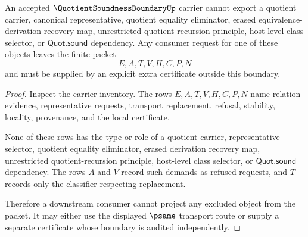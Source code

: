 \begin{theorem}
\label{thm:quotient-soundness-boundary-non-escape}
An accepted $\QuotientSoundnessBoundaryUp$ carrier cannot export a quotient carrier, canonical representative, quotient equality eliminator, erased equivalence-derivation recovery map, unrestricted quotient-recursion principle, host-level class selector, or $\mathsf{Quot.sound}$ dependency. Any consumer request for one of these objects leaves the finite packet
$$
E,A,T,V,H,C,P,N
$$
and must be supplied by an explicit extra certificate outside this boundary.
\end{theorem}
\begin{proof}
Inspect the carrier inventory. The rows $E,A,T,V,H,C,P,N$ name relation evidence, representative requests, transport replacement, refusal, stability, locality, provenance, and the local certificate.

None of these rows has the type or role of a quotient carrier, representative selector, quotient equality eliminator, erased derivation recovery map, unrestricted quotient-recursion principle, host-level class selector, or $\mathsf{Quot.sound}$ dependency. The rows $A$ and $V$ record such demands as refused requests, and $T$ records only the classifier-respecting replacement.

Therefore a downstream consumer cannot project any excluded object from the packet. It may either use the displayed $\psame$ transport route or supply a separate certificate whose boundary is audited independently.
\end{proof}

